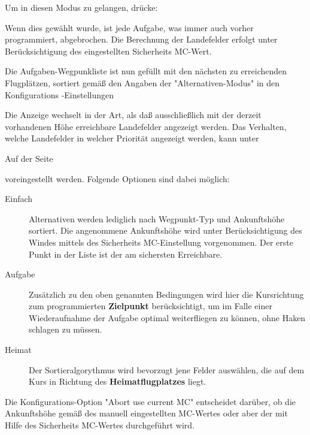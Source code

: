 Um in diesen Modus zu gelangen, drücke:
\begin{quote}
\blink{}\blink{}
\end{quote}

Wenn dies gewählt wurde,  ist jede Aufgabe, was immer auch vorher programmiert, abgebrochen.
Die Berechnung der Landefelder erfolgt unter Berücksichtigung des eingestellten Sicherheits MC-Wert.

Die Aufgaben-Wegpunkliste ist nun gefüllt mit den nächsten zu erreichenden Flugplätzen, sortiert gemäß den Angaben
der  "Alternativen-Modus" in den Konfigurations -Einstellungen 

Die Anzeige wechselt in der Art, als daß ausschließlich mit der derzeit vorhandenen Höhe erreichbare
Landefelder angezeigt werden. Das Verhalten, welche Landefelder in welcher Priorität angezeigt werden, kann unter

\begin{quote}
\blink{}\blink{}
\end{quote}

Auf der Seite

\begin{quote}
\blink{}\blink{}
\end{quote}

voreingestellt werden. Folgende Optionen sind dabei möglich:
\begin{description}
\item[Einfach] Alternativen werden lediglich nach Wegpunkt-Typ und Ankunftshöhe sortiert.
Die angenommene Ankunftshöhe wird unter Berücksichtigung des Windes mittels des Sicherheits  MC-Einstellung vorgenommen.
Der erste Punkt in der Liste  ist der am sichersten Erreichbare.
\item[Aufgabe] Zusätzlich zu den oben genannten Bedingungen wird hier die Kursrichtung zum programmierten \textbf{Zielpunkt} berücksichtigt, um im Falle einer
Wiederaufnahme der Aufgabe optimal weiterfliegen zu können, ohne Haken schlagen zu müssen.
\item[Heimat] Der Sortieralgorythmus wird bevorzugt jene Felder auswählen, die auf dem Kurs in Richtung des \textbf{Heimatflugplatzes} liegt.
\end{description}

Die Konfigurations-Option "Abort use current MC"  entscheidet darüber,
ob die Ankunftshöhe gemäß des manuell eingestellten MC-Wertes oder aber der mit Hilfe des
Sicherheits MC-Wertes durchgeführt wird.

